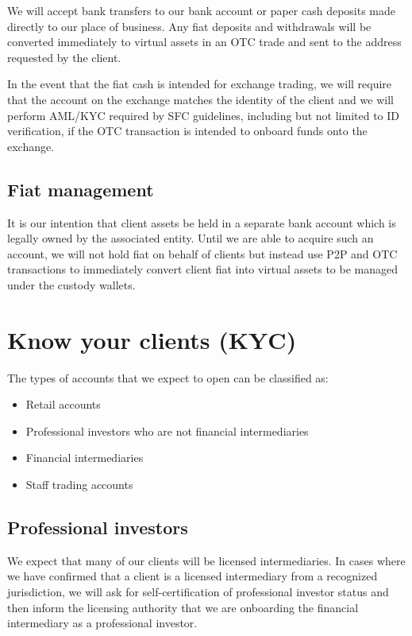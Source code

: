 {We will accept bank transfers to our bank account or paper cash
deposits made directly to our place of business.  Any fiat deposits
and withdrawals will be converted immediately to virtual assets in an
OTC trade and sent to the address requested by the client.

In the event that the fiat cash is intended for exchange trading, we
will require that the account on the exchange matches the identity of
the client and we will perform AML/KYC required by
SFC guidelines, including but not limited to ID verification, if the OTC transaction is intended to onboard funds onto the exchange.

\subsection{Fiat management}
It is our intention that client assets be held in a separate bank
account which is legally owned by the associated entity.  Until we are
able to acquire such an account, we will not hold fiat on behalf of
clients but instead use P2P and OTC transactions to immediately
convert client fiat into virtual assets to be managed under the
custody wallets.
}

\section{Know your clients (KYC)}

The types of accounts that we expect to open can be classified as:

\begin{itemize}
\item Retail accounts
\item Professional investors who are not financial intermediaries
\item Financial intermediaries
\item Staff trading accounts
  \end{itemize}

\subsection{Professional investors}

We expect that many of our clients will be licensed intermediaries.
In cases where we have confirmed that a client is a licensed
intermediary from a recognized jurisdiction, we will ask for
self-certification of professional investor status and then inform the
licensing authority that we are onboarding the financial intermediary
as a professional investor.

